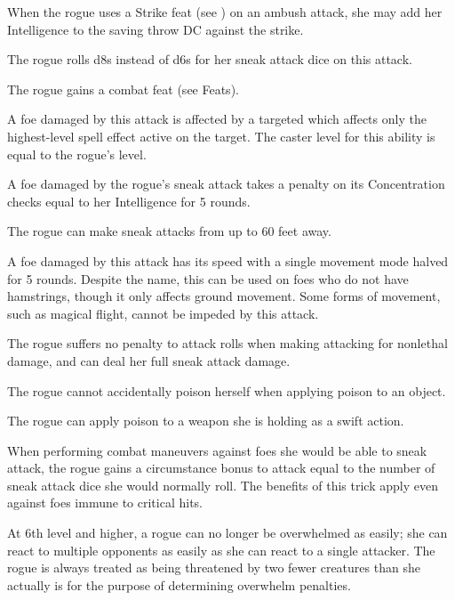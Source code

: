  When the rogue uses a Strike feat (see ) on an ambush attack, she may add her Intelligence to the saving throw DC against the strike.

 The rogue rolls d8s instead of d6s for her sneak attack dice on this attack.

 The rogue gains a combat feat (see Feats).

 A foe damaged by this attack is affected by a targeted  which affects only the highest-level spell effect active on the target. The caster level for this ability is equal to the rogue's level.

 A foe damaged by the rogue's sneak attack takes a penalty on its Concentration checks equal to her Intelligence for 5 rounds.

 The rogue can make sneak attacks from up to 60 feet away.

 A foe damaged by this attack has its speed with a single movement mode halved for 5 rounds. Despite the name, this can be used on foes who do not have hamstrings, though it only affects ground movement. Some forms of movement, such as magical flight, cannot be impeded by this attack.

 The rogue suffers no penalty to attack rolls when making attacking for nonlethal damage, and can deal her full sneak attack damage.

 The rogue cannot accidentally poison herself when applying poison to an object.

 The rogue can apply poison to a weapon she is holding as a swift action.

 When performing combat maneuvers against foes she would be able to sneak attack, the rogue gains a circumstance bonus to attack equal to the number of sneak attack dice she would normally roll. The benefits of this trick apply even against foes immune to critical hits.

 At 6th level and higher, a rogue can no longer be overwhelmed as easily; she can react to multiple opponents as easily as she can react to a single attacker. The rogue is always treated as being threatened by two fewer creatures than she actually is for the purpose of determining overwhelm penalties. 

